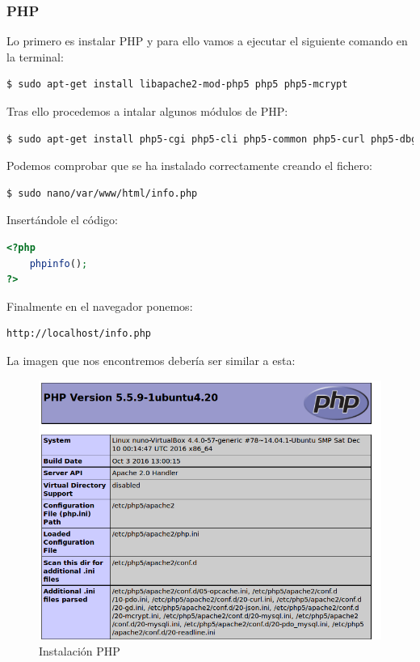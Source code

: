 \subsubsection{PHP}
Lo primero es instalar PHP y para ello vamos a ejecutar el siguiente comando en la terminal:
\begin{lstlisting}[language=bash,keywordstyle=\color{black}]
$ sudo apt-get install libapache2-mod-php5 php5 php5-mcrypt
\end{lstlisting}
Tras ello procedemos a intalar algunos módulos de PHP:
\begin{lstlisting}[language=bash,keywordstyle=\color{black}]
$ sudo apt-get install php5-cgi php5-cli php5-common php5-curl php5-dbg php5-dev php5-gd
\end{lstlisting}
Podemos comprobar que se ha instalado correctamente creando el fichero:
\begin{lstlisting}[language=bash,keywordstyle=\color{black}]
$ sudo nano/var/www/html/info.php
\end{lstlisting}
Insertándole el código:
\begin{lstlisting}[language=PHP,tabsize=4,frame = single,caption=Código par comprobar el funcionamiento de PHP''. ,captionpos=b,label=lst:pruebaPHP]
<?php
	phpinfo();
?>
\end{lstlisting}
Finalmente en el navegador ponemos: 
\begin{lstlisting}[language=html,keywordstyle=\color{black}]
http://localhost/info.php
\end{lstlisting}
La imagen que nos encontremos debería ser similar a esta:
\begin{figure}
\centering
\includegraphics[width=.9\textwidth]{img/php}
\caption{Instalación PHP}
\label{fig:php}
\end{figure}

